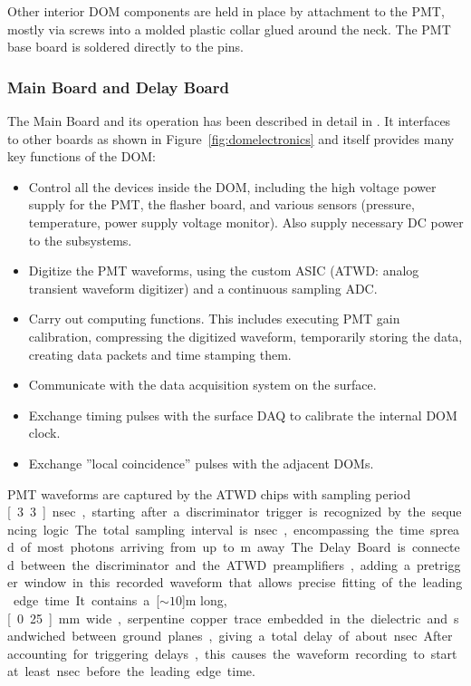 Other interior DOM components are held in place by attachment to the PMT, mostly via screws into
a molded plastic collar glued around the neck.  The PMT base board is soldered directly to the pins.


\subsubsection{\label{sec:mainboard}Main Board and Delay Board}
The Main Board and its operation has been described in detail in \cite{ref:domdaq}.  
It interfaces to other boards as shown in
Figure~\ref{fig:domelectronics} and itself provides many key functions of the DOM:

\begin{itemize}
\item{Control all the devices inside the DOM, including the high voltage power supply for the PMT, 
the flasher board, and various sensors (pressure, temperature, power supply voltage monitor). 
Also supply necessary DC power to the subsystems.}
\item{Digitize the PMT waveforms, using the custom ASIC (ATWD: analog transient waveform digitizer) and a continuous sampling ADC.}
\item{Carry out computing functions. This includes executing PMT gain calibration, compressing 
the digitized waveform, temporarily storing the data, creating data packets and time stamping them.}
\item{Communicate with the data acquisition system on the surface.}
\item{Exchange timing pulses with the surface DAQ to calibrate the internal DOM clock. }
\item{Exchange ”local coincidence” pulses with the adjacent DOMs.}
\end{itemize}

PMT waveforms are captured by the ATWD chips with sampling period \unit[3.3]nsec, starting after 
a discriminator trigger is recognized by the sequencing logic.  The total sampling interval is \unit[427]nsec,  
encompassing the time spread of most photons arriving from up to \unit[100]m away.
The Delay Board is connected between
the discriminator and the ATWD preamplifiers, adding a pretrigger window in this recorded waveform
that allows precise fitting of the leading edge time.  It contains a \unit[$\sim10$]m long, \unit[0.25]mm
wide, serpentine copper trace embedded in the dielectric and sandwiched between ground planes,
giving a total delay of about \unit[75]nsec.  After accounting for triggering delays, this causes the
waveform recording to start at least \unit[10]nsec before the leading edge time.
 
